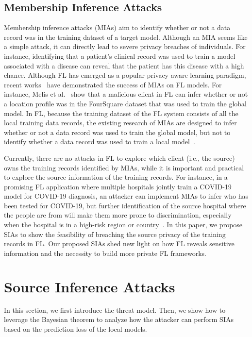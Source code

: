 \documentclass[10pt,journal,compsoc]{IEEEtran}
\begin{document}
\subsection{Membership Inference Attacks}\label{sec::mia}


Membership inference attacks (MIAs) aim to identify whether or not a data record was in the training dataset of a target model. Although an MIA seems like a simple attack, it can directly lead to severe privacy breaches of individuals. For instance, identifying that a patient’s clinical record was used to train a model associated with a disease can reveal that the patient has this disease with a high chance. Although FL has emerged as a popular privacy-aware learning paradigm, recent works~\cite{melis2019exploiting,nasr2019comprehensive,lee2021digestive,zhang2020gan,chen2020beyond,pustozerova2020information,yuan2023interaction} have demonstrated the success of MIAs on FL models. For instance, Melis et al.~\cite{melis2019exploiting} show that a malicious client in FL can infer whether or not a location profile was in the FourSquare dataset that was used to train the global model. In FL, because the training dataset of the FL system consists of all the local training data records, the existing research of MIAs are designed to infer whether or not a data record was used to train the global model, but not to identify whether a data record was used to train a 
local model~\cite{hu2022membership}. 

Currently, there are no attacks in FL to explore which client ({i.e., the source}) owns the training records identified by MIAs, while it is important and practical to explore the source information of the training records. For instance, in a promising FL application where multiple hospitals jointly train a COVID-19 model for COVID-19 diagnosis, an attacker can implement MIAs to infer who has been tested for COVID-19, but further identification of the source hospital where the people are from will make them more prone to discrimination, especially when the hospital is in a high-risk region or country~\cite{devakumar2020racism}. In this paper, we propose SIAs to show the feasibility of breaching the source privacy of the training records in FL. Our proposed SIAs shed new light on how FL reveals sensitive information and the necessity to build more private FL frameworks. 



\section{Source Inference Attacks}\label{sec::03}
In this section, we first introduce the threat model. Then, we show how to leverage the Bayesian theorem to analyze how the attacker can perform SIAs based on the prediction loss of the local models.  
\end{document}
